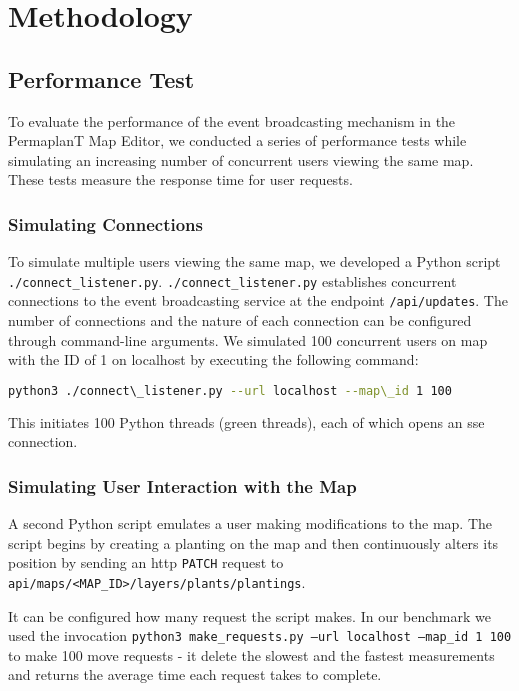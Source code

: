 \documentclass[final,draft,oneside]{vutinfth}
\begin{document}
\chapter{Methodology}

\section{Performance Test}

To evaluate the performance of the event broadcasting mechanism in the PermaplanT Map Editor, we conducted a series of performance tests while simulating an increasing number of concurrent users viewing the same map.
These tests measure the response time for user requests.

\subsection{Simulating Connections}
To simulate multiple users viewing the same map, we developed a Python script \texttt{./connect\_listener.py}.
\texttt{./connect\_listener.py} establishes concurrent connections to the event broadcasting service at the endpoint \texttt{/api/updates}.
The number of connections and the nature of each connection can be configured through command-line arguments.
We simulated 100 concurrent users on map with the ID of 1 on localhost by executing the following command: 
\begin{lstlisting}[language=sh]
python3 ./connect\_listener.py --url localhost --map\_id 1 100
\end{lstlisting}
This initiates 100 Python threads (green threads), each of which opens an \gls{sse} connection.  

\subsection{Simulating User Interaction with the Map}
A second Python script emulates a user making modifications to the map.
The script begins by creating a planting on the map and then continuously alters its position by sending an \gls{http} \texttt{PATCH} request to \texttt{api/maps/<MAP\_ID>/layers/plants/plantings}.

It can be configured how many request the script makes.
In our benchmark we used the invocation \texttt{python3 make\_requests.py --url localhost --map\_id 1 100} to make
100 move requests - it delete the slowest and the fastest measurements and returns the average time each request takes to complete.
\end{document}
